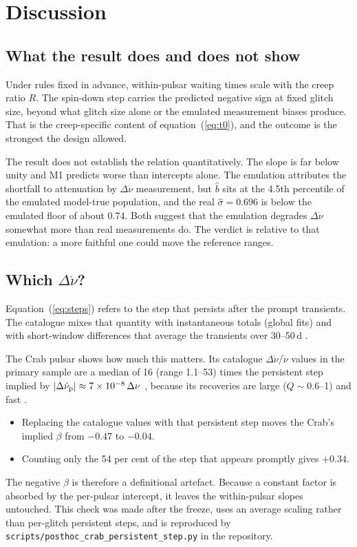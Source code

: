 \documentclass[fleqn,usenatbib]{mnras}
\newcommand{\dnud}{\Delta\dot\nu/\dot\nu}
\newcommand{\bhat}{\hat b}
\newcommand{\shat}{\hat\sigma}
\begin{document}
\section{Discussion}\label{sec:disc}
\subsection{What the result does and does not show}
Under rules fixed in advance, within-pulsar waiting times scale with the
creep ratio $R$. The spin-down step carries the predicted negative sign at
fixed glitch size, beyond what glitch size alone or the emulated measurement
biases produce. That is the creep-specific content of
equation~(\ref{eq:t0}), and the outcome is the strongest the design
allowed.

The result does not establish the relation quantitatively. The slope is
far below unity and M1 predicts worse than intercepts alone. The emulation
attributes the shortfall to attenuation by $\Delta\dot\nu$ measurement, but
$\bhat$ sits at the 4.5th percentile of the emulated model-true population,
and the real $\shat=0.696$ is below the emulated floor of about 0.74. Both
suggest that the emulation degrades $\Delta\dot\nu$ somewhat more than real
measurements do. The verdict is relative to that emulation: a more faithful
one could move the reference ranges.

\subsection{Which \texorpdfstring{$\Delta\dot\nu$}{spin-down step}?}\label{sec:defn}
Equation~(\ref{eq:steps}) refers to the step that persists after the prompt
transients. The catalogue mixes that quantity with instantaneous totals
(global fits) and with short-window differences that average the transients
over 30--50\,d \citep{espinoza2011}.

The Crab pulsar shows how much this matters. Its catalogue $\dnud$ values
in the primary sample are a median of 16 (range 1.1--53) times the
persistent step implied by $|\Delta\dot\nu_{\rm p}|\approx7\times10^{-8}\,
\Delta\nu$ \citep{lyne2015}, because its recoveries are large ($Q\sim0.6$--1)
and fast \citep{wong2001,wang2012}.
\begin{itemize}
\item Replacing the catalogue values with that persistent step moves the
Crab's implied $\beta$ from $-0.47$ to $-0.04$.
\item Counting only the 54 per cent of the step that appears promptly
\citep{lyne2015} gives $+0.34$.
\end{itemize}
The negative $\beta$ is therefore a definitional artefact. Because a
constant factor is absorbed by the per-pulsar intercept, it leaves the
within-pulsar slopes untouched. This check was made after the freeze, uses an
average scaling rather than per-glitch persistent steps, and is reproduced
by \texttt{scripts/posthoc\_crab\_persistent\_step.py} in the repository.
\end{document}

